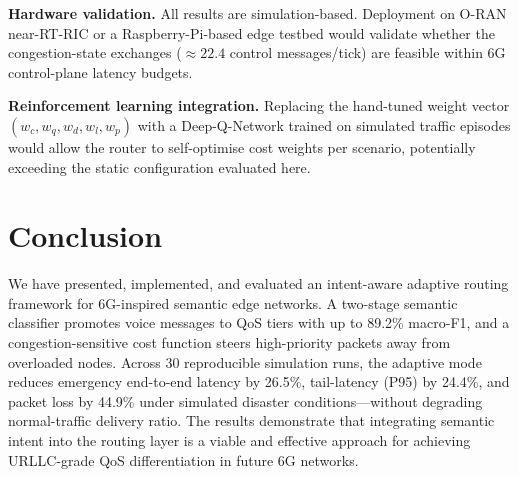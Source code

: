 \documentclass[conference]{IEEEtran}
\begin{document}
\textbf{Hardware validation.}  All results are simulation-based.  Deployment
on O-RAN near-RT-RIC or a Raspberry-Pi-based edge testbed would validate
whether the congestion-state exchanges ($\approx22.4$ control messages/tick)
are feasible within 6G control-plane latency budgets.

\textbf{Reinforcement learning integration.}  Replacing the hand-tuned weight
vector $(w_c,w_q,w_d,w_l,w_p)$ with a Deep-Q-Network trained on simulated
traffic episodes would allow the router to self-optimise cost weights per
scenario, potentially exceeding the static configuration evaluated here.

\section{Conclusion}

We have presented, implemented, and evaluated an intent-aware adaptive routing
framework for 6G-inspired semantic edge networks.  A two-stage semantic
classifier promotes voice messages to QoS tiers with up to 89.2\% macro-F1,
and a congestion-sensitive cost function steers high-priority packets away from
overloaded nodes.  Across 30 reproducible simulation runs, the adaptive mode
reduces emergency end-to-end latency by 26.5\%, tail-latency (P95) by 24.4\%,
and packet loss by 44.9\% under simulated disaster conditions—without degrading
normal-traffic delivery ratio.  The results demonstrate that integrating
semantic intent into the routing layer is a viable and effective approach for
achieving URLLC-grade QoS differentiation in future 6G networks.
\end{document}
